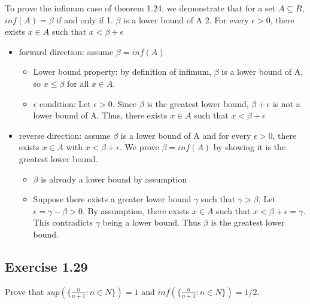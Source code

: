 \documentclass[12pt]{article}
\begin{document}
			To prove the infimum case of theorem 1.24, we demonstrate that for a set $A \subseteq R$, $inf(A) = \beta$ if and only if 1. $\beta$ is a lower bound of A 2. For every $\epsilon > 0$, there exists $x \in A$ such that $x < \beta + \epsilon$
			\begin{itemize}
				\item forward direction: assume $\beta = inf(A)$
				\begin{itemize}
					\item Lower bound property: by definition of infimum, $\beta$ is a lower bound of A, so $x \le \beta$ for all $x \in A$.
					\item $\epsilon$ condition: Let $\epsilon > 0$. Since $\beta$ is the greatest lower bound, $\beta + \epsilon$ is not a lower bound of A. Thus, there exists $x \in A$ such that $x < \beta + \epsilon$
				\end{itemize}
				\item reverse direction: assume $\beta$ is a lower bound of A and for every $\epsilon > 0$, there exists $x \in A$ with $x < \beta + \epsilon$. We prove $\beta = inf(A)$ by showing it is the greatest lower bound.
				\begin{itemize}
					\item $\beta$ is already a lower bound by assumption
					\item Suppose there exists a greater lower bound $\gamma$ such that $\gamma > \beta$. Let $\epsilon = \gamma - \beta > 0$. By assumption, there exists $x \in A$ such that $x < \beta + \epsilon = \gamma$. This contradicts $\gamma$ being a lower bound. Thus $\beta$ is the greatest lower bound.
				\end{itemize}
			\end{itemize}
		\subsection*{Exercise 1.29}
			Prove that $sup(\{\frac{n}{n+1}: n \in N\}) = 1$ and $inf(\{\frac{n}{n+1}: n \in N\}) = 1/2$.
			
\end{document}

